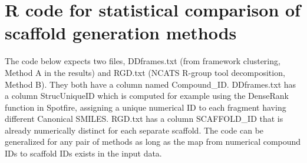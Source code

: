 \documentclass[11pt,letterpaper]{article}
\begin{document}
\newpage 

\section{R code for statistical comparison of scaffold generation methods}
\label{sec:statcode-scafcomp}

The code below expects two files, DDframes.txt (from framework clustering, Method A in the results) and RGD.txt (NCATS R-group tool decomposition, Method B). They both have a column named Compound\_ID. DDframes.txt has a column StrucUniqueID which is computed for example using the DenseRank function in Spotfire, assigning a unique numerical ID to each fragment having different Canonical SMILES.  RGD.txt has a column SCAFFOLD\_ID that is already numerically distinct for each separate scaffold. The code can be generalized for any pair of methods as long as the map from numerical compound IDs to scaffold IDs exists in the input data. 
\end{document}
